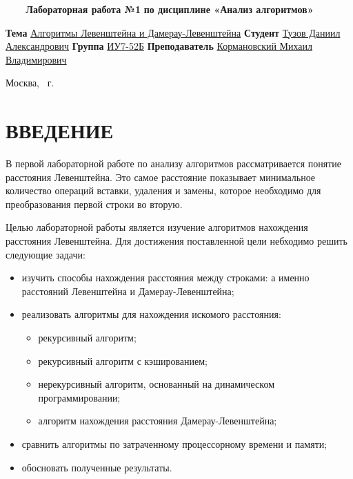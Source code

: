 \documentclass{article}
\begin{document}
\begin{titlepage}
	\noindent\begin{minipage}{1.0\textwidth}\centering
		\Large\textbf{   ~~~ Лабораторная работа №1}\newline
		\textbf{по дисциплине «Анализ алгоритмов»}\newline\newline\newline\newline\newline
	\end{minipage}

	\noindent\textbf{Тема} \underline{Алгоритмы Левенштейна и Дамерау-Левенштейна}\newline\newline
	\textbf{Студент} \underline{Тузов Даниил Александрович}\newline\newline
	\textbf{Группа} \underline{ИУ7-52Б}\newline\newline
	\textbf{Преподаватель} \underline{Кормановский Михаил Владимирович}
	
	\begin{center}
		\vfill
		Москва, \the\year ~г.
	\end{center}
	\restoregeometry
	\clearpage
\end{titlepage}

\renewcommand{\contentsname}{СОДЕРЖАНИЕ} 
\tableofcontents
\setcounter{page}{2}
\clearpage

\section*{ВВЕДЕНИЕ}
В первой лабораторной работе по анализу алгоритмов рассматривается понятие расстояния Левенштейна. 
Это самое расстояние показывает минимальное количество операций вставки, удаления и замены, которое 
необходимо для преобразования первой строки во вторую.

Целью лабораторной работы является изучение алгоритмов нахождения расстояния Левенштейна.
Для достижения поставленной цели небходимо решить следующие задачи:
\begin{itemize}
	\item изучить способы нахождения расстояния между строками: а именно расстояний Левенштейна и  
	Дамерау-Левенштейна;
	\item реализовать алгоритмы для нахождения искомого расстояния:
	\begin{itemize}
		\item рекурсивный алгоритм;
		\item рекурсивный алгоритм с кэшированием;
		\item нерекурсивный алгоритм, основанный на динамическом программировании;
		\item алгоритм нахождения расстояния Дамерау-Левенштейна;
	\end{itemize}
	\item сравнить алгоритмы по затраченному процессорному времени и памяти;
	\item обосновать полученные результаты.
\end{itemize}
\end{document}
